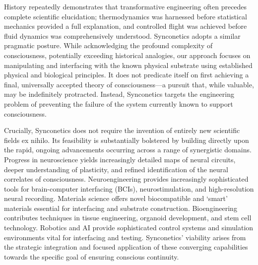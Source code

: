 \documentclass[10pt]{article}
\begin{document}
\begin{sloppypar}
  History repeatedly demonstrates that transformative engineering often precedes complete scientific elucidation; thermodynamics was harnessed before statistical mechanics provided a full explanation, and controlled flight was achieved before fluid dynamics was comprehensively understood. Synconetics adopts a similar pragmatic posture. While acknowledging the profound complexity of consciousness, potentially exceeding historical analogies, our approach focuses on manipulating and interfacing with the known physical substrate using established physical and biological principles. It does not predicate itself on first achieving a final, universally accepted theory of consciousness—a pursuit that, while valuable, may be indefinitely protracted. Instead, Synconetics targets the engineering problem of preventing the failure of the system currently known to support consciousness.

  Crucially, Synconetics does not require the invention of entirely new scientific fields ex nihilo. Its feasibility is substantially bolstered by building directly upon the rapid, ongoing advancements occurring across a range of synergistic domains. Progress in neuroscience yields increasingly detailed maps of neural circuits, deeper understanding of plasticity, and refined identification of the neural correlates of consciousness. Neuroengineering provides increasingly sophisticated tools for brain-computer interfacing (BCIs), neurostimulation, and high-resolution neural recording. Materials science offers novel biocompatible and ‘smart’ materials essential for interfacing and substrate construction. Bioengineering contributes techniques in tissue engineering, organoid development, and stem cell technology. Robotics and AI provide sophisticated control systems and simulation environments vital for interfacing and testing. Synconetics’ viability arises from the strategic integration and focused application of these converging capabilities towards the specific goal of ensuring conscious continuity.


\end{sloppypar}
\end{document}

